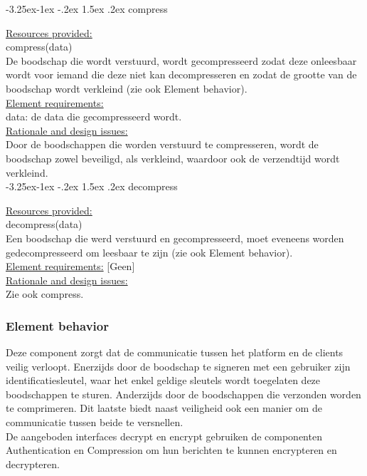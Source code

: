 \documentclass[a4paper,10pt]{article}
\makeatletter
\renewcommand\paragraph{\@startsection{paragraph}{4}{\z@}%
  {-3.25ex\@plus -1ex \@minus -.2ex}%
  {1.5ex \@plus .2ex}%
  {\normalfont\normalsize\bfseries}}
\makeatother
\begin{document}
\paragraph{compress}

\underline{Resources provided:}\\
compress(data)\\
De boodschap die wordt verstuurd, wordt gecompresseerd zodat deze onleesbaar wordt voor iemand die deze niet kan decompresseren en zodat de grootte van de boodschap wordt verkleind  (zie ook Element behavior).\\

\underline{Element requirements:}\\
data: de data die gecompresseerd wordt.\\

\underline{Rationale and design issues:}\\
Door de boodschappen die worden verstuurd te compresseren, wordt de boodschap zowel beveiligd, als verkleind, waardoor ook de verzendtijd wordt verkleind.\\

\paragraph{decompress}

\underline{Resources provided:}\\
decompress(data)\\
Een boodschap die werd verstuurd en gecompresseerd, moet eveneens worden gedecompresseerd om leesbaar te zijn (zie ook Element behavior).\\

\underline{Element requirements:}
[Geen]\\

\underline{Rationale and design issues:}\\
Zie ook compress.\\

\subsubsection*{Element behavior}
Deze component zorgt dat de communicatie tussen het platform en de clients veilig verloopt. Enerzijds door de boodschap te signeren met een gebruiker zijn identificatiesleutel, waar het enkel geldige sleutels wordt toegelaten deze boodschappen te sturen. Anderzijds door de boodschappen die verzonden worden te comprimeren. Dit laatste biedt naast veiligheid ook een manier om de communicatie tussen beide te versnellen.\\
De aangeboden interfaces decrypt en encrypt gebruiken de componenten Authentication en Compression om hun berichten te kunnen encrypteren en decrypteren.\\
\end{document}

